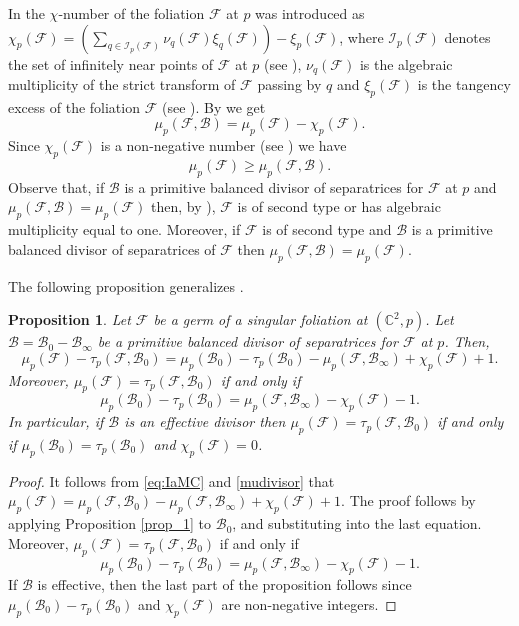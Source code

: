 \documentclass[11pt]{amsart}
\newcommand{\C}{\mathbb{C}}
\newcommand{\F}{\mathcal{F}}
\newcommand{\B}{\mathcal{B}}
\newtheorem{proposition}[theorem]{Proposition}
\begin{document}
\par In \cite[Section 3]{FP-GB-SM2021} the $\chi$-number of the foliation $\F$ at $p$  was introduced as $\chi_p (\mathcal{F})=\left(\sum_{q \in \mathcal I_p(\mathcal{F})}\nu_{q}(\mathcal{F})\xi_q(\F)\right)-\xi_p(\F)$, where $\mathcal I_p(\mathcal{F})$ denotes the set of infinitely near points of $\F$ at $p$ (see \cite[p. 7]{FP-GB-SM2021}), $\nu_{q}(\mathcal{F})$ is the algebraic multiplicity of the strict transform of $\mathcal{F}$ passing by $q$ and $\xi_p(\F)$ is the tangency excess of the foliation $\mathcal F$ (see \cite[Definition 2.3]{FP-GB-SM2021}).
By \cite[Proposition 4.7]{FP-GB-SM2021} we get 
    \begin{equation} \label{eq:IaMC}
    \mu_{p}(\mathcal{F},\mathcal B)=\mu_{p}(\mathcal F)-\chi_p(\mathcal{F}).
    \end{equation}
    Since  $\chi_p(\mathcal{F})$ is a non-negative number (see \cite[Proposition 3.1]{FP-GB-SM2021} ) we have
    \begin{equation}\label{eq:IaMineq}
\mu_{p}(\mathcal F)\geq \mu_{p}(\mathcal{F},\mathcal B).
    \end{equation}
Observe that, if $\mathcal B$ is  a primitive balanced divisor of separatrices for $\mathcal{F}$ at $p$ and $\mu_{p}(\mathcal{F},\mathcal B)=\mu_{p}(\mathcal F)$ then, by \cite[Proposition 3.1]{FP-GB-SM2021}),
$\mathcal F$ is of second type or has algebraic multiplicity equal to one. Moreover, if $\mathcal F$ is of second type and $\mathcal B$ is  a primitive balanced divisor of separatrices of $\mathcal{F}$ then $\mu_{p}(\mathcal{F},\mathcal B)=\mu_{p}(\mathcal F)$.
\par The following proposition generalizes \cite[Corollary B]{FP-GB-SM2021}.
\begin{proposition}\label{iguales}
Let $\F$ be a germ of a singular foliation  at $(\C^2,p)$. Let $\B=\B_0-\B_{\infty}$ be a primitive balanced divisor of separatrices for $\F$ at $p$.  Then,
 \begin{equation*}
 \mu_p(\F)-\tau_p(\F,\B_0)=\mu_p(\B_0)-\tau_p(\B_0)-\mu_p(\F,\B_{\infty})+\chi_p(\F)+1.
 \end{equation*}
 Moreover, $\mu_p(\F)=\tau_p(\F,\B_0)$ if and only if  \[\mu_p(\B_0)-\tau_p(\B_0)=\mu_p(\F,\B_{\infty})-\chi_p(\F)-1.\]
In particular, if $\B$ is an effective divisor then $\mu_p(\F)=\tau_p(\F,\B_0)$ if and only if  $\mu_p(\B_0)=\tau_p(\B_0)$ and $\chi_p(\F)=0$.
\end{proposition}
\begin{proof}
It follows from \eqref{eq:IaMC} and \eqref{mudivisor} that $\mu_{p}(\mathcal F)=\mu_{p}(\mathcal{F},\mathcal{B}_0)-\mu_p(\F,\B_{\infty})+\chi_p(\mathcal{F})+1$. The proof follows by applying Proposition \ref{prop_1} to $\B_0$, and substituting into the last equation.
Moreover, $\mu_p(\F)=\tau_p(\F,\B_0)$ if and only if \[\mu_p(\B_0)-\tau_p(\B_0)=\mu_p(\F,\B_{\infty})-\chi_p(\F)-1.\]
If $\B$ is effective, then the  last part of the proposition follows since $\mu_p(\B_0)-\tau_p(\B_0)$ and $\chi_p(\F)$ are non-negative integers.
\end{proof}
\end{document}
